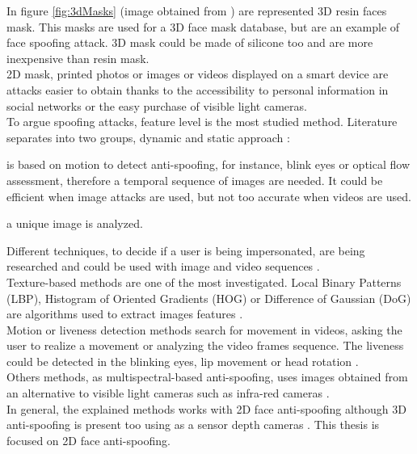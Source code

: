 In figure \ref{fig:3dMasks} (image obtained from \cite{3dmask}) are represented 3D resin faces mask. This masks are used for a 3D face mask database, but are an example of face spoofing attack. 3D mask could be made of silicone too and are more inexpensive than resin mask.\\

2D mask, printed photos or images or videos displayed on a smart device are attacks easier to obtain thanks to the accessibility to personal information in social networks or the easy purchase of visible light cameras.\\

To argue spoofing attacks, feature level is the most studied method. Literature separates into two groups, dynamic and static approach \cite{Spoofing_survey}:
\begin{description}[itemsep=2pt,topsep=8pt,parsep=0pt,partopsep=20pt]
\item[Dynamic:] is based on motion to detect anti-spoofing, for instance, blink eyes or optical flow assessment, therefore a temporal sequence of images are needed. It could be efficient when image attacks are used, but not too accurate when videos are used.
\item[Static:] a unique image is analyzed.
\end{description}

Different techniques, to decide if a user is being impersonated, are being researched and could be used with image and video sequences \cite{Spoofing_survey}.\\

Texture-based methods are one of the most investigated. Local Binary Patterns (LBP),  Histogram of Oriented Gradients (HOG) or Difference of Gaussian (DoG) are algorithms used to extract images features \cite{distorsion,Spoofing_survey}.\\

Motion or liveness detection methods search for movement in videos, asking the user to realize a movement or analyzing the video frames sequence. The liveness could be detected in the blinking eyes, lip movement or head rotation \cite{distorsion,Spoofing_survey}.\\

Others methods, as multispectral-based anti-spoofing, uses images obtained from an alternative to visible light cameras such as infra-red cameras \cite{distorsion}.\\

In general, the explained methods works with 2D face anti-spoofing although 3D anti-spoofing is present too using as a sensor depth cameras \cite{2d_3d_face}. This thesis is focused on 2D face anti-spoofing.\\
